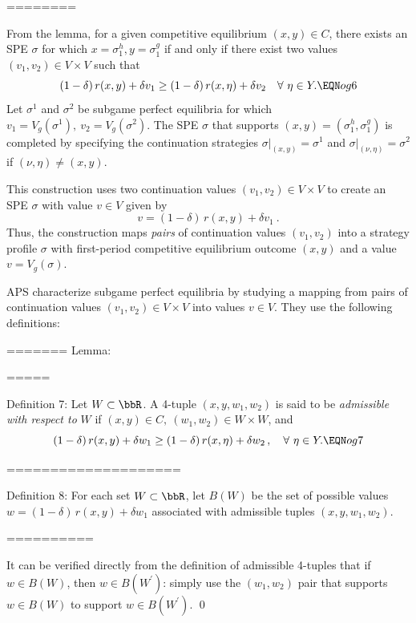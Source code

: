 ========

From the lemma, for a given competitive equilibrium $(x,y)\in C$,
there exists an SPE $\sigma$ for which $x=\sigma^h_1,
y=\sigma^g_1$ if and only if there exist two values $(v_1,v_2)\in V\times V$
 such that
$$(1-\delta)\, r(x,y) + \delta v_1\geq (1-\delta)\, r(x,\eta) + \delta
v_2\quad \forall\ \eta\in Y . \EQN og6$$
Let $\sigma^1$ and $\sigma^2$ be subgame perfect equilibria for which $v_1 =
V_g(\sigma^1),\ v_2=V_g(\sigma^2)$.  The SPE $\sigma$
that supports $(x,y) = (\sigma^h_1,\sigma^g_1)$ is completed by specifying the continuation strategies
$\sigma\vert_{(x,y)} = \sigma^1$ and $\sigma\vert_{(\nu,\eta)} = \sigma^2$ if
$(\nu,\eta) \not= (x,y)$.

This construction uses  two continuation values $(v_1,v_2)\in V \times V$ to create an SPE
$\sigma$ with value $v\in V$ given by
$$v = (1-\delta)\, r(x,y) + \delta v_1\ .$$
Thus, the construction maps {\it pairs\/} of continuation values
 $(v_1,v_2)$ into a strategy profile $\sigma$  with
first-period competitive equilibrium outcome $(x,y)$
and a value $v=V_g(\sigma)$.

APS characterize subgame perfect equilibria by studying a mapping
from pairs of continuation
 values $(v_1,v_2)\in V \times V$ into values $v\in V$.  They use the following
definitions:




=======
{\sc Lemma:} 


=====


\endDefinition
{\sc Definition 7:}  Let $W\subset  \bbR$.  A 4-tuple $(x,y,w_1,w_2)$ is said to be
{\it admissible with respect to\/} $W$ if $(x,y)\in C,\ (w_1,w_2) \in
    W\times W$, and
$$(1-\delta)\, r(x,y)
+\delta w_1 \geq (1-\delta)\, r(x,\eta) + \delta w_2\,,
\quad\forall\ \eta\in Y . \EQN og7$$

====================


\endDefinition

\medskip\noindent
{\sc Definition 8:}  For each set $W\subset \bbR$, let $B(W)$ be the set of
possible values $w=(1-\delta)\, r(x,y) + \delta w_1$ associated with
admissible tuples $(x,y,w_1,w_2)$.

==========

It can be verified directly from the definition of admissible 4-tuples that
if $w\in B(W)$, then $w \in B(W^\prime)$:  simply use the $(w_1,w_2)$
pair that supports $w\in B(W)$ to support $w\in B(W^\prime)$.
\qed

